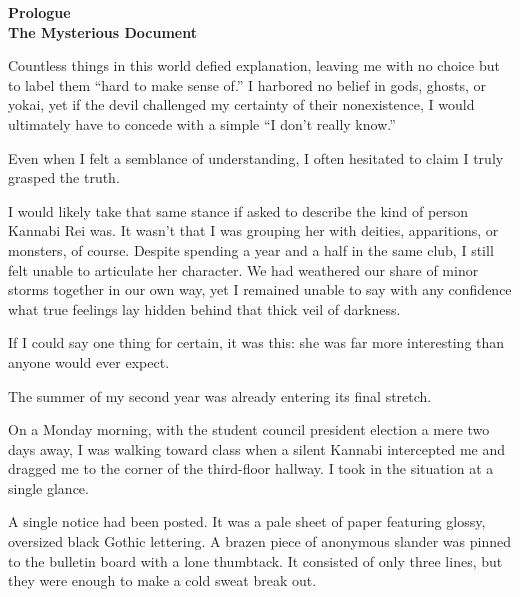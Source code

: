 \documentclass[
    a4paper,
    12pt,
    twoside,
    openany,
    UTF8,
    fontset=windows
]{ctexbook}
\begin{document}
\vspace*{0pt}
\clearpage



\setcounter{page}{1}            %
\clearpage
\thispagestyle{plain}
\begin{center}
    \large\bfseries
    Prologue\\
    The Mysterious Document
\end{center}
\label{sec:prologueV2}
\vspace{1cm}

Countless things in this world defied explanation, leaving me with no choice but to label them ``hard to make sense of.'' I harbored no belief in gods, ghosts, or yokai, yet if the devil challenged my certainty of their nonexistence, I would ultimately have to concede with a simple ``I don't really know.''

Even when I felt a semblance of understanding, I often hesitated to claim I truly grasped the truth.

I would likely take that same stance if asked to describe the kind of person Kannabi Rei was. It wasn't that I was grouping her with deities, apparitions, or monsters, of course. Despite spending a year and a half in the same club, I still felt unable to articulate her character. We had weathered our share of minor storms together in our own way, yet I remained unable to say with any confidence what true feelings lay hidden behind that thick veil of darkness.

If I could say one thing for certain, it was this: she was far more interesting than anyone would ever expect.

The summer of my second year was already entering its final stretch.

On a Monday morning, with the student council president election a mere two days away, I was walking toward class when a silent Kannabi intercepted me and dragged me to the corner of the third-floor hallway. I took in the situation at a single glance.

A single notice had been posted. It was a pale sheet of paper featuring glossy, oversized black Gothic lettering. A brazen piece of anonymous slander was pinned to the bulletin board with a lone thumbtack. It consisted of only three lines, but they were enough to make a cold sweat break out.
\end{document}
